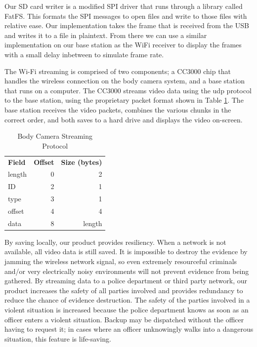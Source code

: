 \documentclass[12pt]{article}
\begin{document}
Our SD card writer is a modified SPI driver that runs through a library called
FatFS. This formats the SPI messages to open files and write to those files with 
relative ease. Our implementation takes the frame that is received from the USB
and writes it to a file in plaintext. From there we can use a similar implementation
on our base station as the WiFi receiver to display the frames with a small delay
inbetween to simulate frame rate. 

The Wi-Fi streaming is comprised of two components; a CC3000 chip that handles
the wireless connection on the body camera system, and a base station that runs
on a computer. The CC3000 streams video data using the \gls{udp} protocol to
the base station, using the proprietary packet format shown in Table
\ref{tab:packet_format}.  The base station receives the video packets, combines
the various chunks in the correct order, and both saves to a hard drive and
displays the video on-screen.

\begin{table}[h]
    \centering
    \caption{Body Camera Streaming Protocol}
    \begin{tabular}{lrr}
        \textbf{Field} & \textbf{Offset} & \textbf{Size (bytes)}\\
        length & 0 & 2\\
        ID & 2 & 1\\
        type & 3 & 1\\
        offset & 4 & 4\\
        data & 8 & length\\
    \end{tabular}
    \label{tab:packet_format}
\end{table}

By saving locally, our product provides resiliency. When a network is not
available, all video data is still saved. It is impossible to destroy the
evidence by jamming the wireless network signal, so even extremely resourceful
criminals and/or very electrically noisy environments will not prevent evidence
from being gathered. By streaming data to a police department or third party
network, our product increases the safety of all parties involved and provides
redundancy to reduce the chance of evidence destruction. The safety of the
parties involved in a violent situation is increased because the police
department knows as soon as an officer enters a violent situation. Backup may
be dispatched without the officer having to request it; in cases where an
officer unknowingly walks into a dangerous situation, this feature is
life-saving.
\end{document}
